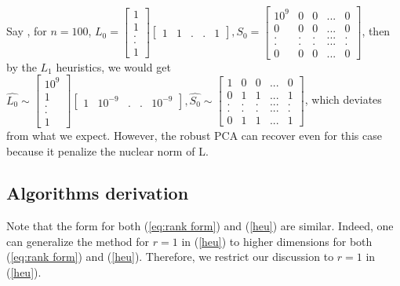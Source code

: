 Say , for $n=100$, $L_{0}=\left[\begin{array}{c}
1\\
1\\
.\\
.\\
1
\end{array}\right]
[\begin{array}{ccccc}
1 & 1 & . & . & 1\end{array}],S_{0}=\left[ \begin{array}{ccccc}
10^{9} & 0 & 0 & ... & 0\\
0 & 0 & 0 & ... & 0\\
. & . & . & ... & .\\
. & . & . & ... & .\\
0 & 0 & 0 & ... & 0
\end{array}\right]$, then by the $L_{1}$ heuristics, we would get $\hat{L_{0}}\sim \left[ \begin{array}{c}
10^{9}\\
1\\
.\\
.\\
1
\end{array} \right]
\left[\begin{array}{ccccc}
1 & 10^{-9} & . & . & 10^{-9}
\end{array}\right], \hat{S_{0}} \sim \left[\begin{array}{ccccc}
1 & 0 & 0 & ... & 0\\
0 & 1 & 1 & ... & 1\\
. & . & . & ... & .\\
. & . & . & ... & .\\
0 & 1 & 1 & ... & 1
\end{array}\right]$, which deviates from what we expect. However, the robust PCA can recover even for this case because it penalize the nuclear norm of L. 

\subsection{Algorithms derivation}

Note that the form for both (\ref{eq:rank form}) and (\ref{heu})
are similar. Indeed, one can generalize the method for $r=1$ in (\ref{heu})
to higher dimensions for both (\ref{eq:rank form}) and (\ref{heu}).
Therefore, we restrict our discussion to $r=1$ in (\ref{heu}).

